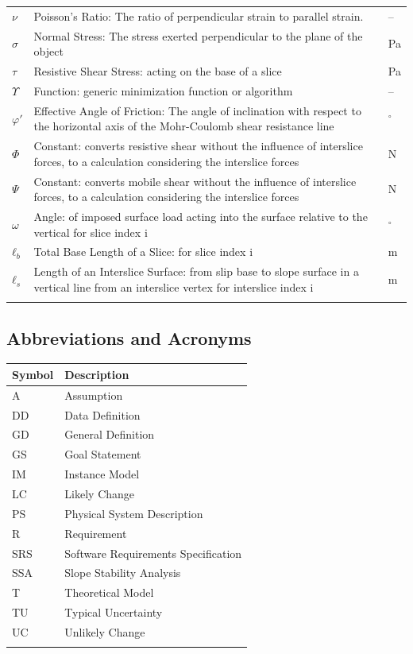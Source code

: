 \documentclass[12pt]{article}
\begin{document}
\begin{longtabu}{l X[l] l}
\\
$ν$ & Poisson's Ratio: The ratio of perpendicular strain to parallel strain. & --
\\
$σ$ & Normal Stress: The stress exerted perpendicular to the plane of the object & Pa
\\
$τ$ & Resistive Shear Stress: acting on the base of a slice & Pa
\\
$Υ$ & Function: generic minimization function or algorithm & --
\\
$φ'$ & Effective Angle of Friction: The angle of inclination with respect to the horizontal axis of the Mohr-Coulomb shear resistance line & ${}^{\circ}$
\\
$Φ$ & Constant: converts resistive shear without the influence of interslice forces, to a calculation considering the interslice forces & N
\\
$Ψ$ & Constant: converts mobile shear without the influence of interslice forces, to a calculation considering the interslice forces & N
\\
$ω$ & Angle: of imposed surface load acting into the surface relative to the vertical for slice index i & ${}^{\circ}$
\\
${ℓ_{b}}$ & Total Base Length of a Slice: for slice index i & m
\\
${ℓ_{s}}$ & Length of an Interslice Surface: from slip base to slope surface in a vertical line from an interslice vertex for interslice index i & m
\\
\bottomrule
\label{Table:ToS}
\end{longtabu}
\subsection{Abbreviations and Acronyms}
\label{Sec:TAbbAcc}
\begin{longtable*}{l l}
\toprule
Symbol & Description
\\
\midrule
A & Assumption
\\
DD & Data Definition
\\
GD & General Definition
\\
GS & Goal Statement
\\
IM & Instance Model
\\
LC & Likely Change
\\
PS & Physical System Description
\\
R & Requirement
\\
SRS & Software Requirements Specification
\\
SSA & Slope Stability Analysis
\\
T & Theoretical Model
\\
TU & Typical Uncertainty
\\
UC & Unlikely Change
\\
\bottomrule
\label{Table:TAbbAcc}
\end{longtable*}
\end{document}
